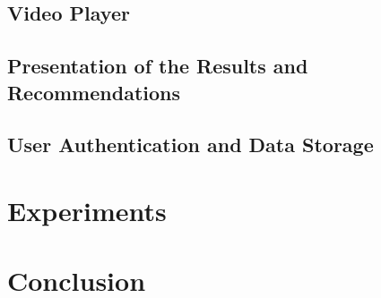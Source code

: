 \section{Video Player}
\label{video_player}

\section{Presentation of the Results and Recommendations}

\section{User Authentication and Data Storage}




\chapter{Experiments}


\chapter{Conclusion}
\label{zaver}




% 